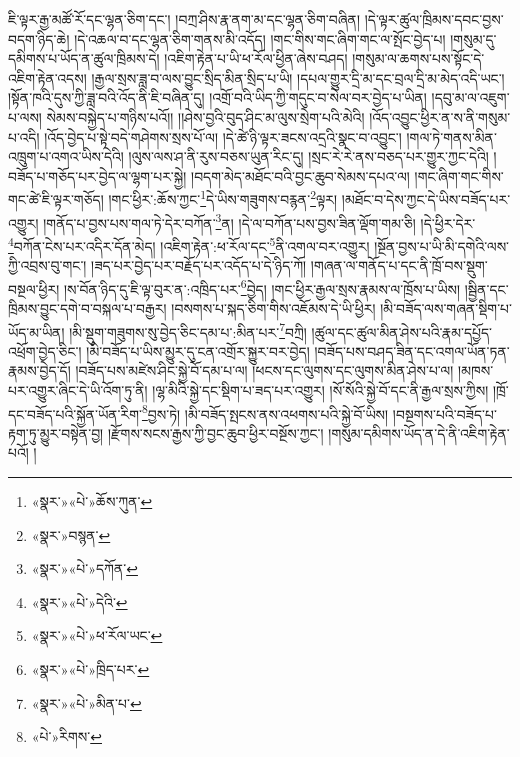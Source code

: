 ཇི་ལྟར་རྒྱ་མཚོ་རོ་དང་ལྷན་ཅིག་དང་། །བཀྲ་ཤིས་རྣ་ནག་མ་དང་ལྷན་ཅིག་བཞིན། །དེ་ལྟར་ཚུལ་ཁྲིམས་དབང་བྱས་བདག་ཉིད་ཆེ། །དེ་འཆལ་བ་དང་ལྷན་ཅིག་གནས་མི་འདོད། །གང་གིས་གང་ཞིག་གང་ལ་སྤོང་བྱེད་པ། །གསུམ་དུ་དམིགས་པ་ཡོད་ན་ཚུལ་ཁྲིམས་དེ། །འཇིག་རྟེན་པ་ཡི་ཕ་རོལ་ཕྱིན་ཞེས་བཤད། །གསུམ་ལ་ཆགས་པས་སྟོང་དེ་འཇིག་རྟེན་འདས། །རྒྱལ་སྲས་ཟླ་བ་ལས་བྱུང་སྲིད་མིན་སྲིད་པ་ཡི། །དཔལ་གྱུར་དྲི་མ་དང་བྲལ་དྲི་མ་མེད་འདི་ཡང་། །སྟོན་ཁའི་དུས་ཀྱི་ཟླ་བའི་འོད་ནི་ཇི་བཞིན་དུ། །འགྲོ་བའི་ཡིད་ཀྱི་གདུང་བ་སེལ་བར་བྱེད་པ་ཡིན། །དབུ་མ་ལ་འཇུག་པ་ལས། སེམས་བསྐྱེད་པ་གཉིས་པའོ།། །།ཤེས་བྱའི་བུད་ཤིང་མ་ལུས་སྲེག་པའི་མེའི། །འོད་འབྱུང་ཕྱིར་ན་ས་ནི་གསུམ་པ་འདི། །འོད་བྱེད་པ་སྟེ་བདེ་གཤེགས་སྲས་པོ་ལ། །དེ་ཚེ་ཉི་ལྟར་ཟངས་འདྲའི་སྣང་བ་འབྱུང་། །གལ་ཏེ་གནས་མིན་འཁྲུག་པ་འགའ་ཡིས་དེའི། །ལུས་ལས་ཤ་ནི་རུས་བཅས་ཡུན་རིང་དུ། །སྲང་རེ་རེ་ནས་བཅད་པར་གྱུར་ཀྱང་དེའི། །བཟོད་པ་གཅོད་པར་བྱེད་ལ་ལྷག་པར་སྐྱེ། །བདག་མེད་མཐོང་བའི་བྱང་ཆུབ་སེམས་དཔའ་ལ། །གང་ཞིག་གང་གིས་གང་ཚེ་ཇི་ལྟར་གཅོད། །གང་ཕྱིར་:ཆོས་ཀྱང་\footnote{«སྣར་»«པེ་»ཆོས་ཀུན་}དེ་ཡིས་གཟུགས་བརྙན་\footnote{«སྣར་»བསྙན་}ལྟར། །མཐོང་བ་དེས་ཀྱང་དེ་ཡིས་བཟོད་པར་འགྱུར། །གནོད་པ་བྱས་པས་གལ་ཏེ་དེར་བཀོན་\footnote{«སྣར་»«པེ་»དཀོན་}ན། །དེ་ལ་བཀོན་པས་བྱས་ཟིན་ལྡོག་གམ་ཅི། །དེ་ཕྱིར་དེར་\footnote{«སྣར་»«པེ་»དེའི་}བཀོན་ངེས་པར་འདིར་དོན་མེད། །འཇིག་རྟེན་:ཕ་རོལ་དང་\footnote{«སྣར་»«པེ་»ཕ་རོལ་ཡང་}ནི་འགལ་བར་འགྱུར། །སྔོན་བྱས་པ་ཡི་མི་དགེའི་ལས་ཀྱི་འབྲས་བུ་གང་། །ཟད་པར་བྱེད་པར་བརྗོད་པར་འདོད་པ་དེ་ཉིད་ཀོ། །གཞན་ལ་གནོད་པ་དང་ནི་ཁྲོ་བས་སྡུག་བསྔལ་ཕྱིར། །ས་བོན་ཉིད་དུ་ཇི་ལྟ་བུར་ན་:འཁྲིད་པར་\footnote{«སྣར་»«པེ་»ཁྲིད་པར་}བྱེད། །གང་ཕྱིར་རྒྱལ་སྲས་རྣམས་ལ་ཁྲོས་པ་ཡིས། །སྦྱིན་དང་ཁྲིམས་བྱུང་དགེ་བ་བསྐལ་པ་བརྒྱར། །བསགས་པ་སྐད་ཅིག་གིས་འཇོམས་དེ་ཡི་ཕྱིར། །མི་བཟོད་ལས་གཞན་སྡིག་པ་ཡོད་མ་ཡིན། །མི་སྡུག་གཟུགས་སུ་བྱེད་ཅིང་དམ་པ་:མིན་པར་\footnote{«སྣར་»«པེ་»མིན་པ་}བཀྲི། །ཚུལ་དང་ཚུལ་མིན་ཤེས་པའི་རྣམ་དཔྱོད་འཕྲོག་བྱེད་ཅིང་། །མི་བཟོད་པ་ཡིས་མྱུར་དུ་ངན་འགྲོར་སྐྱུར་བར་བྱེད། །བཟོད་པས་བཤད་ཟིན་དང་འགལ་ཡོན་ཏན་རྣམས་བྱེད་དོ། །བཟོད་པས་མཛེས་ཤིང་སྐྱེ་བོ་དམ་པ་ལ། །ཕངས་དང་ལུགས་དང་ལུགས་མིན་ཤེས་པ་ལ། །མཁས་པར་འགྱུར་ཞིང་དེ་ཡི་འོག་ཏུ་ནི། །ལྷ་མིའི་སྐྱེ་དང་སྡིག་པ་ཟད་པར་འགྱུར། །སོ་སོའི་སྐྱེ་བོ་དང་ནི་རྒྱལ་སྲས་ཀྱིས། །ཁྲོ་དང་བཟོད་པའི་སྐྱོན་ཡོན་རིག་\footnote{«པེ་»རིགས་}བྱས་ཏེ། །མི་བཟོད་སྤངས་ནས་འཕགས་པའི་སྐྱེ་བོ་ཡིས། །བསྔགས་པའི་བཟོད་པ་རྟག་ཏུ་མྱུར་བསྟེན་བྱ། །རྫོགས་སངས་རྒྱས་ཀྱི་བྱང་ཆུབ་ཕྱིར་བསྔོས་ཀྱང་། །གསུམ་དམིགས་ཡོད་ན་དེ་ནི་འཇིག་རྟེན་པའོ། །

